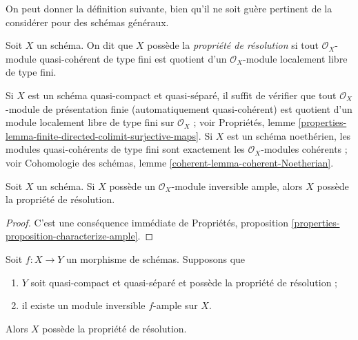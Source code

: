 \medskip\noindent
On peut donner la définition suivante, bien qu'il ne soit guère pertinent
de la considérer pour des schémas généraux.

\begin{definition}
\label{definition-resolution-property}
Soit $X$ un schéma. On dit que $X$ possède la {\it propriété de résolution}
si tout $\mathcal{O}_X$-module quasi-cohérent de type fini
est quotient d'un $\mathcal{O}_X$-module localement libre de type fini.
\end{definition}

\noindent
Si $X$ est un schéma quasi-compact et quasi-séparé, il suffit de vérifier que
tout $\mathcal{O}_X$-module de présentation finie (automatiquement
quasi-cohérent) est quotient d'un module localement libre de type fini
sur $\mathcal{O}_X$ ; voir Propriétés, lemme
\ref{properties-lemma-finite-directed-colimit-surjective-maps}.
Si $X$ est un schéma noethérien, les modules quasi-cohérents de type fini
sont exactement les $\mathcal{O}_X$-modules cohérents ; voir
Cohomologie des schémas, lemme \ref{coherent-lemma-coherent-Noetherian}.

\begin{lemma}
\label{lemma-resolution-property-ample}
Soit $X$ un schéma. Si $X$ possède un $\mathcal{O}_X$-module inversible ample,
alors $X$ possède la propriété de résolution.
\end{lemma}

\begin{proof}
C'est une conséquence immédiate de Propriétés, proposition
\ref{properties-proposition-characterize-ample}.
\end{proof}

\begin{lemma}
\label{lemma-resolution-property-ample-relative}
Soit $f : X \to Y$ un morphisme de schémas. Supposons que
\begin{enumerate}
\item $Y$ soit quasi-compact et quasi-séparé et possède la propriété de résolution ;
\item il existe un module inversible $f$-ample sur $X$.
\end{enumerate}
Alors $X$ possède la propriété de résolution.
\end{lemma}


